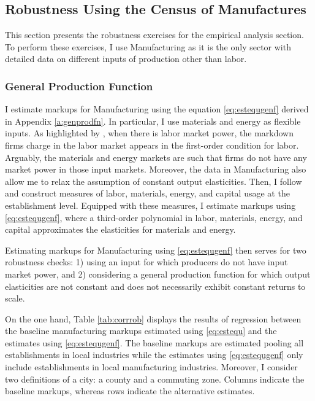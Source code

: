 \subsection{Robustness Using the Census of Manufactures}\label{a:robust}
This section presents the robustness exercises for the empirical analysis section. To perform these exercises, I use Manufacturing as it is the only sector with detailed data on different inputs of production other than labor. 

\subsubsection{General Production Function}

I estimate markups for Manufacturing using the equation \eqref{eq:estequgenf} derived in Appendix \ref{a:genprodfn}. In particular, I use materials and energy as flexible inputs. As highlighted by \textcite{YehMacaluso&Hershbein2022}, when there is labor market power, the markdown firms charge in the labor market appears in the first-order condition for labor. Arguably, the materials and energy markets are such that firms do not have any market power in those input markets. Moreover, the data in Manufacturing also allow me to relax the assumption of constant output elasticities. Then, I follow \textcite{FosterGrim&Haltiwanger16} and construct measures of labor, materials, energy, and capital usage at the establishment level. Equipped with these measures, I estimate markups using \eqref{eq:estequgenf}, where a third-order polynomial in labor, materials, energy, and capital approximates the elasticities for materials and energy.

Estimating markups for Manufacturing using \eqref{eq:estequgenf} then serves for two robustness checks: 1) using an input for which producers do not have input market power, and 2) considering a general production function for which output elasticities are not constant and does not necessarily exhibit constant returns to scale.

On the one hand, Table \ref{tab:corrrob} displays the results of regression between the baseline manufacturing markups estimated using \eqref{eq:estequ} and the estimates using \eqref{eq:estequgenf}. The baseline markups are estimated pooling all establishments in local industries while the estimates using \eqref{eq:estequgenf} only include establishments in local manufacturing industries. Moreover, I consider two definitions of a city: a county and a commuting zone. Columns indicate the baseline markups, whereas rows indicate the alternative estimates.

